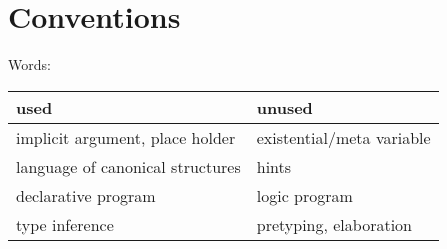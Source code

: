 \setcounter{chapter}{-2}
\chapter{Conventions}

Words:\\
\begin{tabular}{ll}
used & unused \\\hline
implicit argument, place holder & existential/meta variable \\
language of canonical structures & hints \\
declarative program & logic program \\
type inference & pretyping, elaboration \\
\end{tabular}

